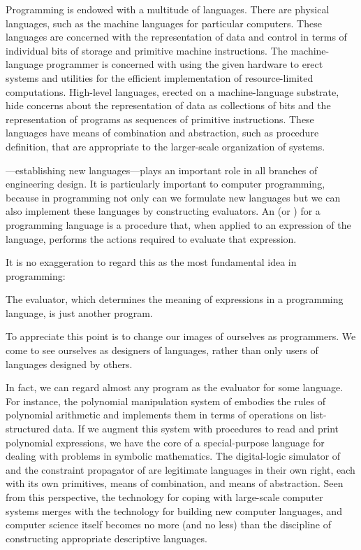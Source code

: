 Programming is endowed with a multitude of languages.  There are physical
languages, such as the machine languages for particular computers.  These
languages are concerned with the representation of data and control in terms of
individual bits of storage and primitive machine instructions.  The
machine-language programmer is concerned with using the given hardware to erect
systems and utilities for the efficient implementation of resource-limited
computations.  High-level languages, erected on a machine-language substrate,
hide concerns about the representation of data as collections of bits and the
representation of programs as sequences of primitive instructions.  These
languages have means of combination and abstraction, such as procedure
definition, that are appropriate to the larger-scale organization of systems.

---establishing new languages---plays an
important role in all branches of engineering design.  It is particularly
important to computer programming, because in programming not only can we
formulate new languages but we can also implement these languages by
constructing evaluators.  An  (or ) for
a programming language is a procedure that, when applied to an expression of
the language, performs the actions required to evaluate that expression.

It is no exaggeration to regard this as the most fundamental idea in
programming:

\begin{niceQuote}
The evaluator, which determines the meaning of expressions in a programming
language, is just another program.
\end{niceQuote}

\noindent
To appreciate this point is to change our images of ourselves as programmers.
We come to see ourselves as designers of languages, rather than only users of
languages designed by others.

In fact, we can regard almost any program as the evaluator for some language.
For instance, the polynomial manipulation system of 
embodies the rules of polynomial arithmetic and implements them in terms of
operations on list-structured data.  If we augment this system with procedures
to read and print polynomial expressions, we have the core of a special-purpose
language for dealing with problems in symbolic mathematics.  The digital-logic
simulator of  and the constraint propagator of
 are legitimate languages in their own right, each with its own
primitives, means of combination, and means of abstraction.  Seen from this
perspective, the technology for coping with large-scale computer systems merges
with the technology for building new computer languages, and computer science
itself becomes no more (and no less) than the discipline of constructing
appropriate descriptive languages.


